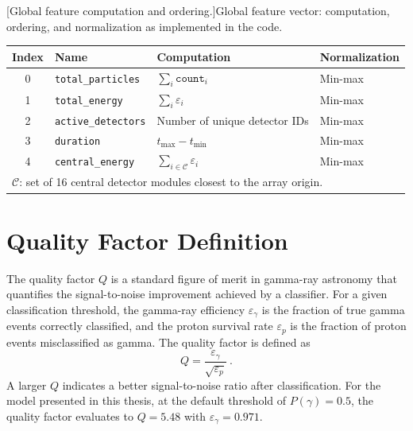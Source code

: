 \begin{center}
\begin{minipage}{\linewidth}
\centering
{}[Global feature computation and ordering.]{Global feature vector: computation, ordering, and normalization as implemented in the code.}
\label{tab:global_features_order}
\setlength{\tabcolsep}{5pt}
\renewcommand{\arraystretch}{1.2}
\begin{tabular}{clll}
\toprule
\textbf{Index} & \textbf{Name} & \textbf{Computation} & \textbf{Normalization} \\
\midrule
0 & \texttt{total\_particles}   & $\sum_i \texttt{count}_i$ & Min-max \\
1 & \texttt{total\_energy}      & $\sum_i \varepsilon_i$ & Min-max \\
2 & \texttt{active\_detectors}  & Number of unique detector IDs & Min-max \\
3 & \texttt{duration}           & $t_\text{max} - t_\text{min}$ & Min-max \\
4 & \texttt{central\_energy}    & $\sum_{i \in \mathcal{C}} \varepsilon_i$ & Min-max \\
\bottomrule
\multicolumn{4}{l}{\footnotesize $\mathcal{C}$: set of 16 central detector modules closest to the array origin.}
\end{tabular}
\end{minipage}
\end{center}

\section{Quality Factor Definition} \label{sec:apx_qfactor}

The quality factor $Q$ is a standard figure of merit in gamma-ray astronomy that quantifies the signal-to-noise improvement achieved by a classifier. For a given classification threshold, the gamma-ray efficiency $\varepsilon_\gamma$ is the fraction of true gamma events correctly classified, and the proton survival rate $\varepsilon_p$ is the fraction of proton events misclassified as gamma. The quality factor is defined as
\begin{equation}
    Q = \frac{\varepsilon_\gamma}{\sqrt{\varepsilon_p}} \ .
\end{equation}
A larger $Q$ indicates a better signal-to-noise ratio after classification. For the model presented in this thesis, at the default threshold of $P(\gamma) = 0.5$, the quality factor evaluates to $Q = 5.48$ with $\varepsilon_\gamma = 0.971$.

